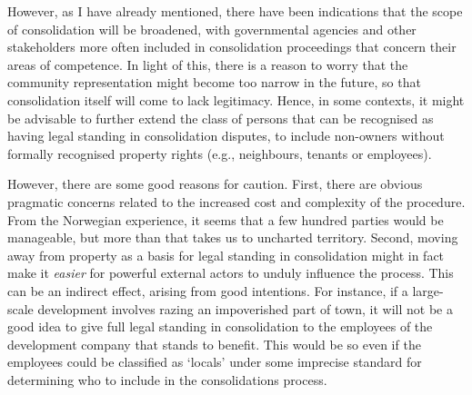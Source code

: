 However, as I have already mentioned, there have been indications that the scope of consolidation will be broadened, with governmental agencies and other stakeholders more often included in consolidation proceedings that concern their areas of competence. In light of this, there is a reason to worry that the community representation might become too narrow in the future, so that consolidation itself will come to lack legitimacy. Hence, in some contexts, it might be advisable to further extend the class of persons that can be recognised as having legal standing in consolidation disputes, to include non-owners without formally recognised property rights (e.g., neighbours, tenants or employees). 

However, there are some good reasons for caution. First, there are obvious pragmatic concerns related to the increased cost and complexity of the procedure. From the Norwegian experience, it seems that a few hundred parties would be manageable, but more than that takes us to uncharted territory. Second, moving away from property as a basis for legal standing in consolidation might in fact make it {\it easier} for powerful external actors to unduly influence the process. This can be an indirect effect, arising from good intentions. For instance, if a large-scale development involves razing an impoverished part of town, it will not be a good idea to give full legal standing in consolidation to the employees of the development company that stands to benefit. This would be so even if the employees could be classified as `locals' under some imprecise standard for determining who to include in the consolidations process.


